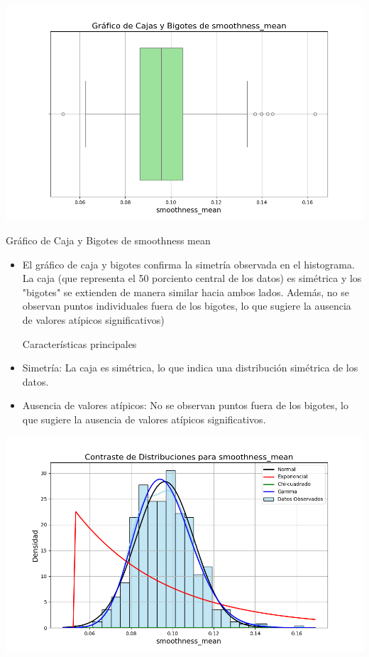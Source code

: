 \documentclass[a4paper, 12pt]{article}
\begin{document}
\includegraphics[width=\textwidth]{../Plots/plots_stats/smoothness_mean/boxplot_smoothness_mean.png}

Gráfico de Caja y Bigotes de smoothness mean
\begin{itemize}
\item El gráfico de caja y bigotes confirma la simetría observada en el histograma. La caja (que representa el 50 porciento central de los datos) es simétrica y los "bigotes" se extienden de manera similar hacia ambos lados. Además, no se observan puntos individuales fuera de los bigotes, lo que sugiere la ausencia de valores atípicos significativos)

Características principales

\item Simetría: La caja es simétrica, lo que indica una distribución simétrica de los datos.
\item Ausencia de valores atípicos: No se observan puntos fuera de los bigotes, lo que sugiere la ausencia de valores atípicos significativos.
\end{itemize}

\includegraphics[width=\textwidth]{../Plots/plots_stats/smoothness_mean/distribuciones_conocidas_smoothness_mean.png}
\end{document}
